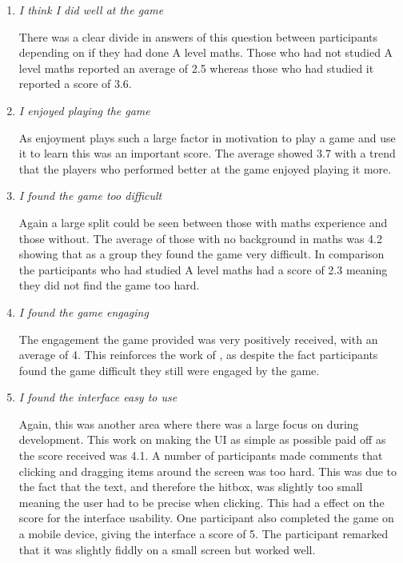 \documentclass[12pt,a4paper]{report}
\begin{document}
\begin{enumerate}
	\item  \textit {I think I did well at the game}
	
	There was a clear divide in answers of this question between participants depending on if they had done A level maths. Those who had not studied A level maths reported an average of 2.5 whereas those who had studied it reported a score of 3.6. 
	
	\item  \textit {I enjoyed playing the game}
	
	As enjoyment plays such a large factor in motivation to play a game and use it to learn this was an important score. The average showed 3.7 with a trend that the players who performed better at the game enjoyed playing it more. 
	
	\item  \textit {I found the game too difficult}
	
	Again a large split could be seen between those with maths experience and those without. The average of those with no background in maths was 4.2 showing that as a group they found the game very difficult. In comparison the participants who had studied A level maths had a score of 2.3 meaning they did not find the game too hard.
	
	\item  \textit {I found the game engaging}
	
	The engagement the game provided was very positively received, with an average of 4. This reinforces the work of \cite{abuhamdeh2012importance}, as despite the fact participants found the game difficult they still were engaged by the game.
	
	\item  \textit {I found the interface easy to use}

Again, this was another area where there was a large focus on during development. This work on making the UI as simple as possible paid off as the score received was 4.1. A number of participants made comments that clicking and dragging items around the screen was too hard. This was due to the fact that the text, and therefore the hitbox, was slightly too small meaning the user had to be precise when clicking. This had a effect on the score for the interface usability. One participant also completed the game on a mobile device, giving the interface a score of 5. The participant remarked that it was slightly fiddly on a small screen but worked well.
	

\end{enumerate}
\end{document}

